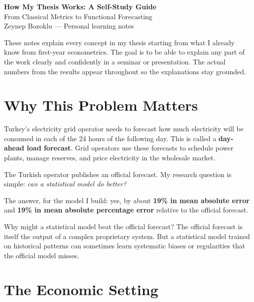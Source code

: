 \documentclass[11pt,a4paper]{article}
\begin{document}
\begin{center}
{\LARGE \textbf{How My Thesis Works: A Self-Study Guide}}\\[0.5em]
{\large From Classical Metrics to Functional Forecasting}\\[0.5em]
{\normalsize Zeynep Bozoklu \quad --- \quad Personal learning notes}
\end{center}

\vspace{1em}

These notes explain every concept in my thesis starting from what I already
know from first-year econometrics. The goal is to be able to explain any
part of the work clearly and confidently in a seminar or presentation.
The actual numbers from the results appear throughout so the explanations
stay grounded.

\tableofcontents

\newpage

\section{Why This Problem Matters}

Turkey's electricity grid operator needs to forecast how much electricity
will be consumed in each of the 24 hours of the following day. This is
called a \textbf{day-ahead load forecast}. Grid operators use these
forecasts to schedule power plants, manage reserves, and price electricity
in the wholesale market.

The Turkish operator publishes an official forecast. My research question
is simple: \textit{can a statistical model do better?}

The answer, for the model I build: yes, by about \textbf{19\% in mean
absolute error} and \textbf{19\% in mean absolute percentage error}
relative to the official forecast.

Why might a statistical model beat the official forecast? The official
forecast is itself the output of a complex proprietary system. But a
statistical model trained on historical patterns can sometimes learn
systematic biases or regularities that the official model misses.

\section{The Economic Setting}
\end{document}
